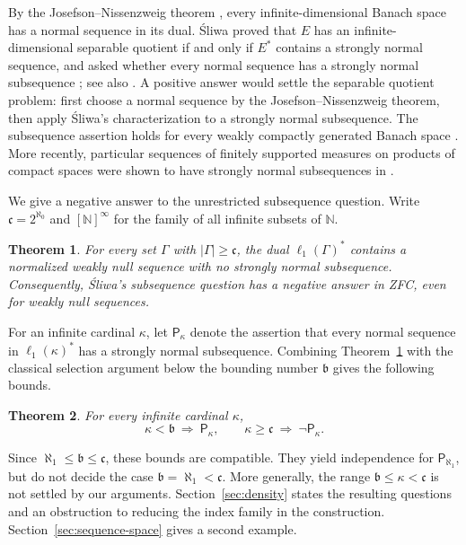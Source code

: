 \documentclass[11pt,a4paper]{amsart}
\newtheorem{maintheorem}{Theorem}
\theoremstyle{remark}
\newcommand{\N}{\mathbb N}
\newcommand{\cfrak}{\mathfrak c}
\begin{document}
By the Josefson--Nissenzweig theorem \cite{Josefson,Nissenzweig}, every
infinite-dimensional Banach space has a normal sequence in its dual.
\'Sliwa \cite[Theorem~3]{Sliwa} proved that $E$ has an
infinite-dimensional separable quotient if and only if $E^*$ contains
a strongly normal sequence, and asked whether every normal sequence
has a strongly normal subsequence \cite[p.~388]{Sliwa}; see also
\cite[Problem~7]{FKLS}. A positive answer would settle the separable
quotient problem: first choose a normal sequence by the
Josefson--Nissenzweig theorem, then apply \'Sliwa's characterization to
a strongly normal subsequence. The subsequence assertion holds for
every weakly compactly generated Banach space
\cite[Proposition~4]{Sliwa}. More recently, particular sequences of
finitely supported measures on products of compact spaces were shown
to have strongly normal subsequences in \cite[Theorem~2(5)]{KLS}.

We give a negative answer to the unrestricted subsequence question.
Write $\cfrak=2^{\aleph_0}$ and $[\N]^\infty$ for the family of all
infinite subsets of $\N$.

\begin{maintheorem}\label{thm:large}
For every set $\Gamma$ with $|\Gamma|\geqslant\cfrak$, the dual
$\ell_1(\Gamma)^*$ contains a normalized weakly null sequence with no
strongly normal subsequence. Consequently, \'Sliwa's subsequence
question has a negative answer in ZFC, even for weakly null sequences.
\end{maintheorem}

For an infinite cardinal $\kappa$, let $\mathsf P_\kappa$ denote the
assertion that every normal sequence in $\ell_1(\kappa)^*$ has a
strongly normal subsequence. Combining Theorem~\ref{thm:large} with
the classical selection argument below the bounding number
$\mathfrak b$ gives the following bounds.

\begin{maintheorem}\label{thm:bounds}
For every infinite cardinal $\kappa$,
\[
 \kappa<\mathfrak b\ \Longrightarrow\ \mathsf P_\kappa,
 \qquad
 \kappa\geqslant\cfrak\ \Longrightarrow\ \neg\mathsf P_\kappa.
\]
\end{maintheorem}

Since $\aleph_1\leqslant\mathfrak b\leqslant\cfrak$, these bounds
are compatible. They yield independence for $\mathsf P_{\aleph_1}$,
but do not decide the case $\mathfrak b=\aleph_1<\cfrak$. More
generally, the range $\mathfrak b\leqslant\kappa<\cfrak$ is not
settled by our arguments. Section~\ref{sec:density} states the resulting
questions and an obstruction to reducing the index family in the
construction. Section~\ref{sec:sequence-space} gives a second example.
\end{document}

